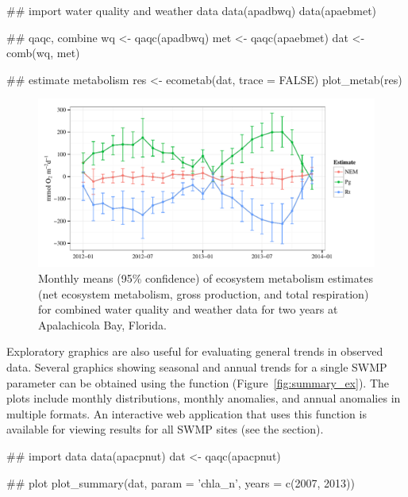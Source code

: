 \begin{example}
## import water quality and weather data
data(apadbwq)
data(apaebmet)

## qaqc, combine
wq <- qaqc(apadbwq)
met <- qaqc(apaebmet)
dat <- comb(wq, met)

## estimate metabolism
res <- ecometab(dat, trace = FALSE)
plot_metab(res)
\end{example}
\begin{figure}[!h]

{\centering \includegraphics[width=\textwidth]{metab_ex-1} 

}

\caption[Monthly means (95\% confidence) of ecosystem metabolism estimates (net ecosystem metabolism, gross production, and total respiration) for combined water quality and weather data for two years at Apalachicola Bay, Florida]{Monthly means (95\% confidence) of ecosystem metabolism estimates (net ecosystem metabolism, gross production, and total respiration) for combined water quality and weather data for two years at Apalachicola Bay, Florida.}\label{fig:metab_ex}
\end{figure}

Exploratory graphics are also useful for evaluating general trends in observed data.  Several graphics showing seasonal and annual trends for a single SWMP parameter can be obtained using the  function (Figure~\ref{fig:summary_ex}).  The plots include monthly distributions, monthly anomalies, and annual anomalies in multiple formats.  An interactive  web application \citep{Chang15} that uses this function is available for viewing results for all SWMP sites (see the  section).

\begin{example}
## import data
data(apacpnut)
dat <- qaqc(apacpnut)

## plot
plot_summary(dat, param = 'chla_n', years = c(2007, 2013))
\end{example}

